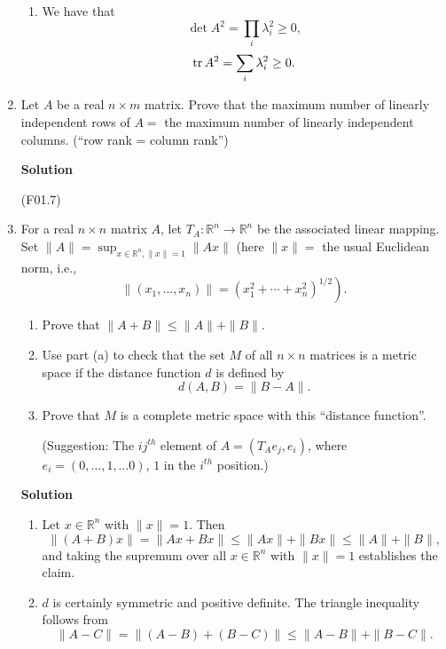 \documentclass{article}
\def\tr{\mathop{\rm tr}\nolimits}
\begin{document}
\begin{enumerate}
\begin{enumerate}
\item We have that
\[\det A^2 = \prod_i \lambda_i^2 \geq 0,\]
\[\tr A^2 = \sum_i \lambda_i^2 \geq 0.\]

\end{enumerate}



\item Let \(A\) be a real \(n \times m\) matrix.  Prove that the maximum number of linearly independent rows of \(A = \) the maximum number of linearly independent columns.  (``row rank = column rank'')

{\bf Solution}

(F01.7)



\item For a real \(n \times n\) matrix \(A\), let \(T_A : \mathbb{R}^n \to \mathbb{R}^n\) be the associated linear mapping.  Set \(\|A\| = \sup_{x \in \mathbb{R}^n, \|x\| = 1} \|Ax\|\) (here \(\|x\| = \) the usual Euclidean norm, i.e.,
\[\left. \|(x_1, \ldots, x_n)\| = \left( x_1^2 + \cdots + x_n^2 \right)^{1/2} \right).\]

\begin{enumerate}
\item Prove that \(\|A + B\| \leq \|A\| + \|B\|\).

\item Use part (a) to check that the set \(M\) of all \(n \times n\) matrices is a metric space if the distance function \(d\) is defined by
\[d(A,B) = \|B - A\|.\]

\item Prove that \(M\) is a complete metric space with this ``distance function''.

(Suggestion:  The \(ij^{th}\) element of \(A = (T_Ae_j, e_i)\), where \(e_i = (0, \ldots, 1, \ldots 0)\), \(1\) in the \(i^{th}\) position.)

\end{enumerate}

{\bf Solution}

\begin{enumerate}
\item Let \(x \in \mathbb{R}^n\) with \(\|x\| = 1\).  Then
\[\|(A + B)x\| = \|Ax + Bx\|
            \leq \|Ax\| + \|Bx\|
            \leq \|A\| + \|B\|,\]
and taking the supremum over all \(x \in \mathbb{R}^n\) with \(\|x\| = 1\) establishes the claim.

\item \(d\) is certainly symmetric and positive definite.  The triangle inequality follows from
\[\|A - C\| = \|(A - B) + (B - C)\|
         \leq \|A - B\| + \|B - C\|.\]


\end{enumerate}
\end{enumerate}
\end{document}
